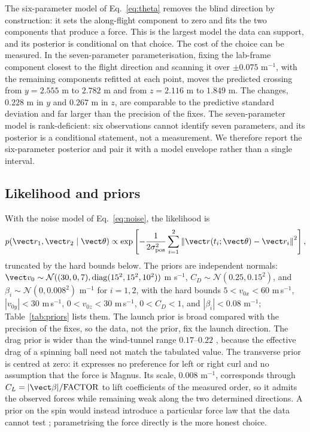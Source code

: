 The six-parameter model of Eq.~\eqref{eq:theta} removes the blind direction by
construction: it sets the along-flight component to zero and fits the two
components that produce a force. This is the largest model the data can support,
and its posterior is conditional on that choice. The cost of the choice can be
measured. In the seven-parameter parameterisation, fixing the lab-frame
component closest to the flight direction and scanning it over $\pm0.075$
m$^{-1}$, with the remaining components refitted at each point, moves the
predicted crossing from $y=2.555$ m to $2.782$ m and from $z=2.116$ m to
$1.849$ m. The changes, $0.228$ m in $y$ and $0.267$ m in $z$, are comparable to
the predictive standard deviation and far larger than the precision of the
fixes. The seven-parameter model is rank-deficient: six observations cannot
identify seven parameters, and its posterior is a conditional statement, not a
measurement. We therefore report the six-parameter posterior and pair it with a
model envelope rather than a single interval.

\subsection{Likelihood and priors}
\label{sec:priors}

With the noise model of Eq.~\eqref{eq:noise}, the likelihood is
\begin{equation}
  p(\vect r_1,\vect r_2\mid\vect\theta)
  \propto\exp\left[-\frac{1}{2\sigma_{\rm pos}^2}
  \sum_{i=1}^{2}\left\|\vect r(t_i;\vect\theta)-\vect r_i\right\|^2\right],
  \label{eq:like}
\end{equation}
truncated by the hard bounds below. The priors are independent normals:
$\vect v_0\sim\mathcal N((30,0,7),\operatorname{diag}(15^2,15^2,10^2))$
m s$^{-1}$, $C_D\sim\mathcal N(0.25,0.15^2)$, and
$\beta_i\sim\mathcal N(0,0.008^2)$ m$^{-1}$ for $i=1,2$, with the hard bounds
$5 < v_{0x} < 60$ m\,s$^{-1}$,
$|v_{0y}| < 30$ m\,s$^{-1}$,
$0 < v_{0z} < 30$ m\,s$^{-1}$,
$0 < C_D < 1$, and
$|\beta_i| < 0.08$ m$^{-1}$; Table~\ref{tab:priors} lists them. The launch prior is broad compared
with the precision of the fixes, so the data, not the prior, fix the launch
direction. The drag prior is wider than the
wind-tunnel range $0.17$--$0.22$ \citep{carre2005,goff2012}, because the
effective drag of a spinning ball need not match the tabulated value. The transverse prior is centred at zero: it expresses no
preference for left or right curl and no assumption that the force is Magnus.
Its scale, $0.008$ m$^{-1}$, corresponds through
$C_L=|\vect\beta|/\mathrm{FACTOR}$ to lift coefficients of the measured order, so
it admits the observed forces while remaining weak along the two determined
directions. A prior on the spin would instead introduce a particular force law
that the data cannot test \citep{texier2016}; parametrising the force directly is
the more honest choice.

